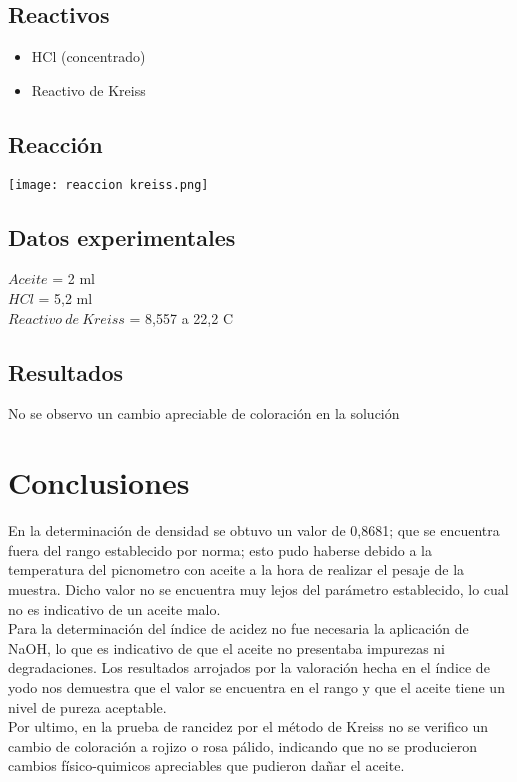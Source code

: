 \documentclass[a4paper,12pt]{article} %
\begin{document}
\subsection{Reactivos} 
\begin{itemize}
    \item{HCl (concentrado)}
    \item{Reactivo de Kreiss}
\end{itemize}
\subsection{Reacción}
\texttt{[image: reaccion kreiss.png]}
\subsection{Datos experimentales} 
$Aceite$ = 2 ml \\
$HCl$ = 5,2 ml  \\
$Reactivo\ de \ Kreiss$ = 8,557 a 22,2 C  \\

\subsection{Resultados}
No se observo un cambio apreciable de coloración en la solución 




\newpage

\section{Conclusiones}
En la determinación de densidad se obtuvo un valor de 0,8681; que se encuentra fuera del rango establecido por norma; esto pudo haberse debido a la temperatura del picnometro con aceite a la hora de realizar el pesaje de la muestra. Dicho valor no se encuentra muy lejos del parámetro establecido, lo cual no es indicativo de un aceite malo.\\
Para la determinación del índice de acidez no fue necesaria la aplicación de NaOH, lo que es indicativo de que el aceite no presentaba impurezas ni degradaciones.\newline
Los resultados arrojados por la valoración hecha en el índice de yodo nos demuestra que el valor se encuentra en el rango y que el aceite tiene un nivel de pureza aceptable.\\
Por ultimo, en la prueba de rancidez por el método de Kreiss no se verifico un cambio de coloración a rojizo o rosa pálido, indicando que no se producieron cambios físico-quimicos apreciables que pudieron dañar el aceite.
\end{document}
